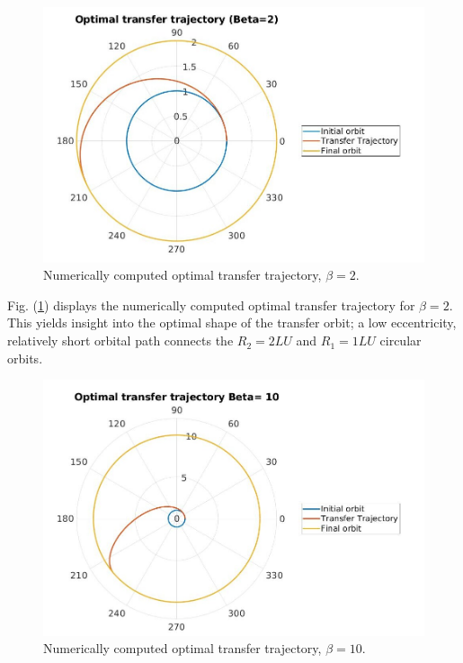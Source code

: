 \begin{figure}[H]
    \includegraphics[width=\linewidth]{./jpgs/thrustArcB2.jpg}
    \caption{Numerically computed optimal transfer trajectory, $\beta = 2$.}
    \label{fig:Tarc-B2}
  \end{figure}

\noindent Fig. (\ref{fig:Tarc-B2}) displays the numerically computed optimal transfer
trajectory for $\beta = 2$. This yields insight into the optimal shape of the transfer orbit; a low 
eccentricity, relatively short orbital path connects the $R_2 = 2 LU$ and $R_1 = 1 LU$ circular orbits.

  \begin{figure}[H]
    \includegraphics[width=\linewidth]{./jpgs/thrustArcB10.jpg}
    \caption{Numerically computed optimal transfer trajectory, $\beta = 10$.}
    \label{fig:Tarc-B10}
  \end{figure}

